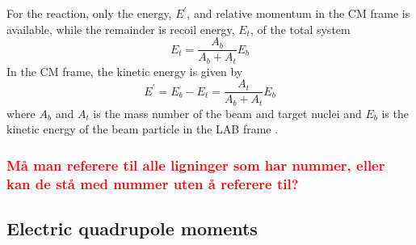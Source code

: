 \documentclass[twoside,english]{uiofysmaster/uiofysmaster}
\begin{document}
For the reaction, only the energy, $E^{'}$, and relative momentum in the CM frame is available, while the remainder is recoil energy, $E_t$, of the total system
\begin{equation}
	E_t = \frac{A_b}{A_b + A_t} E_b
\end{equation}
In the CM frame, the kinetic energy is given by
\begin{equation}
	E^{'} = E_b - E_t = \frac{A_t}{A_b + A_t} E_{b}
\end{equation}
where $A_b$ and $A_t$ is the mass number of the beam and target nuclei and $E_{b}$ is the kinetic energy of the beam particle in the LAB frame \cite{Niedermaier, NaR}.


\subsubsection*{\textcolor{red}{Må man referere til alle ligninger som har nummer, eller kan de stå med nummer uten å referere til?}}



\subsection{Electric quadrupole moments}
\end{document}
